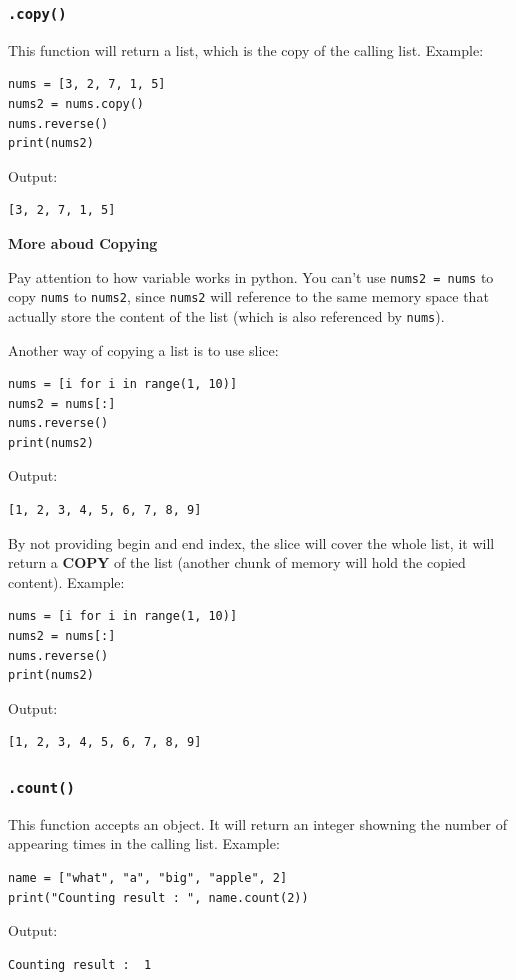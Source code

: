 \documentclass[12pt]{book}
\begin{document}
\subsubsection{\texttt{.copy()}}
\label{sec:org5fd891b}
This function will return a list, which is the copy of the calling list. Example:
\begin{verbatim}
nums = [3, 2, 7, 1, 5]
nums2 = nums.copy()
nums.reverse()
print(nums2)
\end{verbatim}
Output:
\begin{verbatim}
[3, 2, 7, 1, 5]
\end{verbatim}

\textbf{More aboud Copying}

Pay attention to how variable works in python. You can't use \texttt{nums2 = nums} to copy \texttt{nums} to \texttt{nums2}, since \texttt{nums2} will reference to the same memory space that actually store the content of the list (which is also referenced by \texttt{nums}).

Another way of copying a list is to use slice:
\begin{verbatim}
nums = [i for i in range(1, 10)]
nums2 = nums[:]
nums.reverse()
print(nums2)
\end{verbatim}
Output:
\begin{verbatim}
[1, 2, 3, 4, 5, 6, 7, 8, 9]
\end{verbatim}
By not providing begin and end index, the slice will cover the whole list, it will return a \textbf{COPY} of the list (another chunk of memory will hold the copied content). Example:
\begin{verbatim}
nums = [i for i in range(1, 10)]
nums2 = nums[:]
nums.reverse()
print(nums2)
\end{verbatim}
Output:
\begin{verbatim}
[1, 2, 3, 4, 5, 6, 7, 8, 9]
\end{verbatim}
\subsubsection{\texttt{.count()}}
\label{sec:org5ffc1e3}
This function accepts an object. It will return an integer showning the number of appearing times in the calling list. Example:
\begin{verbatim}
name = ["what", "a", "big", "apple", 2]
print("Counting result : ", name.count(2))
\end{verbatim}
Output:
\begin{verbatim}
Counting result :  1
\end{verbatim}
\end{document}
